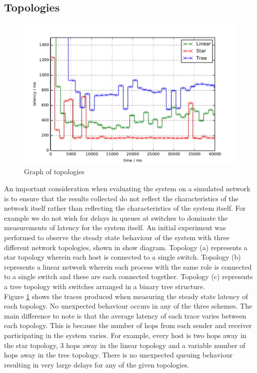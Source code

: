 \subsection{Topologies}

\begin{figure}
  \includegraphics{include/topos.pdf}
  \caption{Graph of topologies}
  \label{fig:topo-graph}
\end{figure}

An important consideration when evaluating the system on a simulated network is to ensure that the results collected do not reflect the characteristics of the network itself rather than reflecting the characteristics of the system itself. For example we do not wish for delays in queues at switches to dominate the measurements of latency for the system itself. An initial experiment was performed to observe the steady state behaviour of the system with three different network topologies, shown in {\color{red}show diagram}. Topology (a) represents a star topology wherein each host is connected to a single switch. Topology (b) represents a linear network wherein each process with the same role is connected to a single switch and these are each connected together. Topology (c) represents a tree topology with switches arranged in a binary tree structure. \\

Figure \ref{fig:topo-graph} shows the traces produced when measuring the steady state latency of each topology. No unexpected behaviour occurs in any of the three schemes. The main difference to note is that the average latency of each trace varies between each topology. This is because the number of hops from each sender and receiver participating in the system varies. For example, every host is two hops away in the star topology, 3 hops away in the linear topology and a variable number of hops away in the tree topology. There is no unexpected queuing behaviour resulting in very large delays for any of the given topologies. \\

